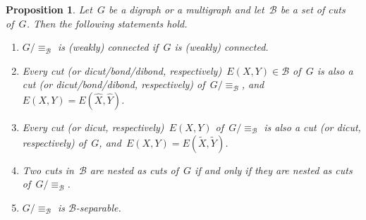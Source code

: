 \documentclass[reqno, 12pt]{amsart}
\numberwithin{equation}{section}
\numberwithin{figure}{section}
\theoremstyle{plain}
\newtheorem{proposition}[thm]{Proposition}
\theoremstyle{definition}
\begin{document}
\begin{proposition}
    \label{prop:quotient}
    Let~$G$ be a digraph or a multigraph 
    and let~$\mathcal{B}$ be a set of cuts of~$G$. 
    Then the following statements hold.
    \begin{enumerate}[label=\textit{(\roman*)}]
        \item \label{item:quo-weakly-con} 
            {${G{/}{\equiv_\mathcal{B}}}$ is (weakly) connected if~$G$ is (weakly) connected.}
        \item \label{item:quo-dicut-down} 
            {Every cut (or dicut/bond/dibond, respectively)~${E(X, Y) \in \mathcal{B}}$ of~$G$ 
            is also a cut (or dicut/bond/dibond, respectively) of~${G{/}{\equiv_\mathcal{B}}}$, 
            and~${E(X, Y) = E(\hat{X}, \hat{Y})}$.}
        \item \label{item:quo-dicut-up} 
            {Every cut (or dicut, respectively)~${E(X, Y)}$ of~${G{/}{\equiv_\mathcal{B}}}$ 
            is also a cut (or dicut, respectively) of~$G$, 
            and~${E(X,Y) = E(\tilde{X},\tilde{Y})}$.}
        \item \label{item:quo-dicut-nested} 
            {Two cuts in~$\mathcal{B}$ are nested as cuts of~$G$ if and only if they are nested as cuts of~$G{/}{\equiv_\mathcal{B}}$.}
        \item \label{item:quo-fin-disep} 
            {${G{/}{\equiv_\mathcal{B}}}$ is $\mathcal{B}$-separable.}
    \end{enumerate}
\end{proposition}
\end{document}
